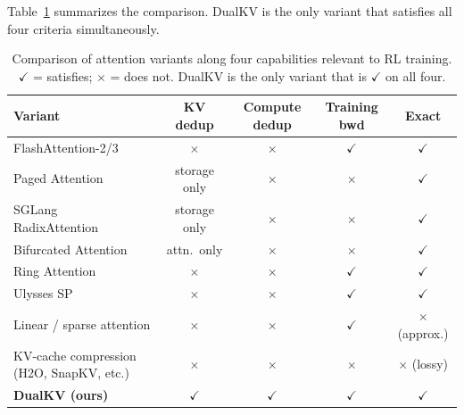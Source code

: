\documentclass{article}
\begin{document}
Table~\ref{tab:attention-comparison} summarizes the comparison. DualKV is the only variant that satisfies all four criteria simultaneously.

\begin{table}[ht]
\centering
\scriptsize
\setlength{\tabcolsep}{4pt}
\caption{Comparison of attention variants along four capabilities relevant to RL training. $\checkmark$ = satisfies; $\times$ = does not. DualKV is the only variant that is $\checkmark$ on all four.}
\label{tab:attention-comparison}
\begin{tabular}{@{}l c c c c@{}}
\toprule
\textbf{Variant} & \textbf{KV dedup} & \textbf{Compute dedup} & \textbf{Training bwd} & \textbf{Exact} \\
\midrule
FlashAttention-2/3~\citep{dao2023flashattention2,shah2024flashattention3} & $\times$ & $\times$ & $\checkmark$ & $\checkmark$ \\
Paged Attention~\citep{kwon2023vllm}              & storage only       & $\times$ & $\times$  & $\checkmark$ \\
SGLang RadixAttention~\citep{zheng2023sglang}     & storage only       & $\times$ & $\times$  & $\checkmark$ \\
Bifurcated Attention~\citep{athiwaratkun2024bifurcated} & attn.\ only & $\times$ & $\times$  & $\checkmark$ \\
Ring Attention~\citep{liu2023ringattention}        & $\times$           & $\times$ & $\checkmark$       & $\checkmark$ \\
Ulysses SP~\citep{jacobs2023ulysses}              & $\times$           & $\times$ & $\checkmark$       & $\checkmark$ \\
Linear / sparse attention                          & $\times$           & $\times$ & $\checkmark$       & $\times$ (approx.) \\
KV-cache compression (H2O, SnapKV, etc.)           & $\times$           & $\times$ & $\times$ & $\times$ (lossy) \\
\midrule
\textbf{DualKV (ours)}                             & $\checkmark$       & $\checkmark$ & $\checkmark$   & $\checkmark$ \\
\bottomrule
\end{tabular}
\end{table}
\end{document}
